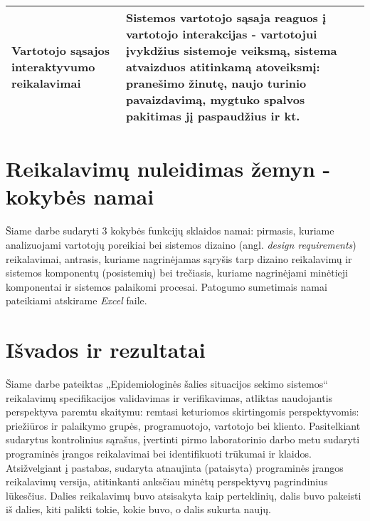 \documentclass{VUMIFPSkursinis}
\begin{document}
\begin{center}
\begin{longtable}{|C{2cm}|L{5cm}|L{8cm}|}
		\color{blue}Vartotojo sąsajos interaktyvumo reikalavimai          &
		\color{blue}Sistemos vartotojo sąsaja reaguos į vartotojo interakcijas - vartotojui įvykdžius sistemoje veiksmą, sistema atvaizduos atitinkamą atoveiksmį: pranešimo žinutę, naujo turinio pavaizdavimą, mygtuko spalvos pakitimas jį paspaudžius ir kt.                                                                                                                                                                                                                                                                                                                                                                                                                                                                                                                                              \\ \hline
	\end{longtable}
\end{center}

\section{Reikalavimų nuleidimas žemyn - kokybės namai}

Šiame darbe sudaryti 3 kokybės funkcijų sklaidos namai: pirmasis, kuriame analizuojami vartotojų poreikiai bei
sistemos dizaino (angl. \textit{design requirements}) reikalavimai, antrasis, kuriame nagrinėjamas sąryšis tarp 
dizaino reikalavimų ir sistemos komponentų (posistemių) bei trečiasis, kuriame nagrinėjami minėtieji komponentai 
ir sistemos palaikomi procesai. Patogumo sumetimais namai pateikiami atskirame \textit{Excel} faile.

\section{Išvados ir rezultatai}

Šiame darbe pateiktas „Epidemiologinės šalies situacijos sekimo sistemos“ reikalavimų specifikacijos validavimas ir verifikavimas, atliktas naudojantis perspektyva paremtu
skaitymu: remtasi keturiomos skirtingomis perspektyvomis: priežiūros ir palaikymo grupės, programuotojo, vartotojo bei kliento. Pasitelkiant sudarytus kontrolinius sąrašus, 
įvertinti pirmo laboratorinio darbo metu sudaryti programinės įrangos reikalavimai bei identifikuoti trūkumai ir klaidos. Atsižvelgiant į pastabas, sudaryta atnaujinta (pataisyta)
programinės įrangos reikalavimų versija, atitinkanti anksčiau minėtų perspektyvų pagrindinius lūkesčius. Dalies reikalavimų buvo atsisakyta kaip perteklinių, dalis buvo pakeisti iš dalies,
kiti palikti tokie, kokie buvo, o dalis sukurta naujų. 
\end{document}
